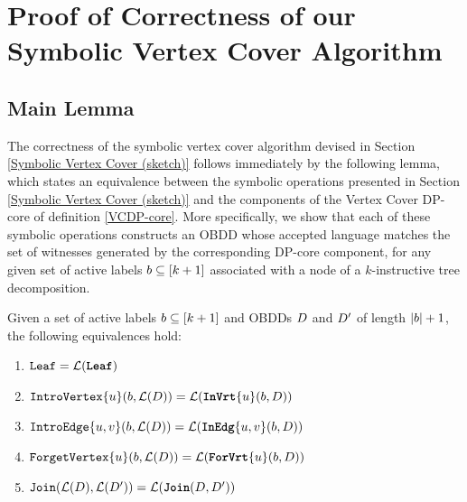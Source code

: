 









\section{Proof of Correctness of our Symbolic Vertex Cover Algorithm}



\subsection{Main Lemma}

The correctness of the symbolic vertex cover algorithm devised in Section \ref{Symbolic Vertex Cover (sketch)} follows immediately by the following lemma, which states an equivalence between the symbolic operations presented in Section \ref{Symbolic Vertex Cover (sketch)} and the components of the {\sc Vertex Cover} DP-core of definition \ref{VCDP-core}. More specifically, we show that each of these symbolic operations constructs an OBDD whose accepted language matches the set of witnesses generated by the corresponding DP-core component, for any given set of active labels $b \subseteq [k+1]$ associated with a node of a $k$-instructive tree decomposition.

\begin{lemma}
\label{lemma:mainLemma}
    Given a set of active labels $b \subseteq [k+1]$ and OBDDs $D$ and $D'$ of length $|b|+1$, the following equivalences hold:
\begin{enumerate}[label=\arabic*.,left=0pt,labelsep=2pt]
\item \label{mainLeaf} $\texttt{Leaf} = \mathcal{L}(\texttt{\textbf{Leaf}})$
\item \label{mainIntroVertex} $\texttt{IntroVertex}\{u\}(b, \mathcal{L}(D)) = \mathcal{L}(\texttt{\textbf{InVrt}}\{u\}(b,D))$
\item \label{mainIntroEdge}$\texttt{IntroEdge}\{u,v\}(b,\mathcal{L}(D)) = \mathcal{L}(\texttt{\textbf{InEdg}}\{u,v\}(b,D))$
\item \label{mainForgetVertex} $\texttt{ForgetVertex}\{u\}(b,\mathcal{L}(D)) = \mathcal{L}(\texttt{\textbf{ForVrt}}\{u\}(b,D))$
\item \label{mainJoin} $\texttt{Join}(\mathcal{L}(D),\mathcal{L}(D')) = \mathcal{L}(\texttt{\textbf{Join}}(D,D'))$
\end{enumerate}
\end{lemma}

